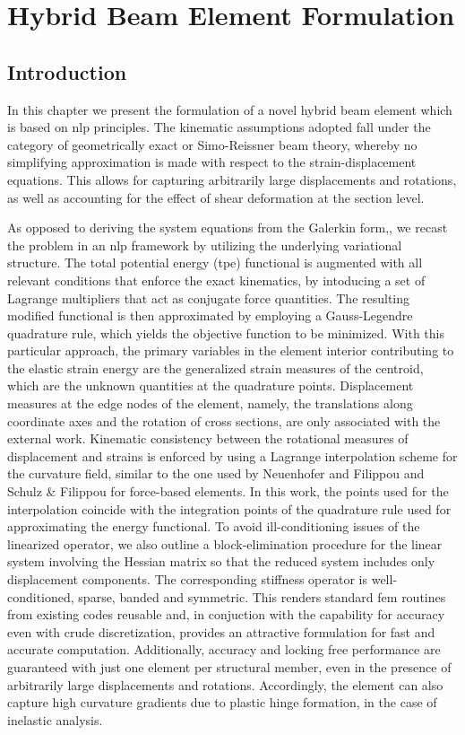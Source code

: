 \chapter{Hybrid Beam Element Formulation}\label{chapter:CH2}


\section{Introduction}\label{section:CH2-S1}
In this chapter we present the formulation of a
novel hybrid beam element which is based on \acrshort{nlp} principles. The 
kinematic assumptions adopted fall under the category of 
geometrically exact or Simo-Reissner beam 
theory\cite{Reissner1,Simo1,Simo2,Simo3}, whereby no simplifying approximation 
is made with respect to the strain-displacement equations. This allows for 
capturing arbitrarily large displacements and rotations, as well as 
accounting for the effect of shear deformation at the section level. 

As opposed to deriving the system equations
from the Galerkin form,, we recast the
problem in an \acrshort{nlp} framework by utilizing the underlying
variational structure. The total potential energy (\acrshort{tpe}) functional 
is augmented with
all relevant conditions that enforce the exact kinematics, by intoducing a set
of Lagrange multipliers that act as conjugate force quantities. The resulting
modified functional is then approximated by employing a Gauss-Legendre 
quadrature
rule, which yields the objective function to be minimized. With this particular
approach, the primary variables in the element interior contributing to the
elastic strain energy are the generalized strain measures of the
centroid, which are the unknown quantities at the quadrature points.
Displacement measures at the edge nodes of the element, namely, the translations
along coordinate axes and the rotation of cross sections, are only
associated with the external work. Kinematic consistency between the rotational
measures of displacement and strains is enforced by using a Lagrange
interpolation scheme for the curvature field, similar to the one
used by Neuenhofer and
Filippou \cite{Neuenhofer} and Schulz \& Filippou \cite{Schulz}
for force-based elements. In this work, the points used for 
the interpolation
coincide with the integration points of the quadrature rule used for 
approximating
the energy functional. To avoid ill-conditioning issues of the 
linearized operator, we also outline a block-elimination procedure for the 
linear system involving the Hessian matrix so that the
reduced system includes only displacement components. The corresponding
stiffness operator is well-conditioned, sparse, banded and symmetric. This 
renders standard \acrshort{fem} routines from existing codes 
reusable and, in conjuction with the capability for accuracy even with crude
discretization, provides an attractive formulation for fast and accurate
computation. Additionally, accuracy and locking free performance are guaranteed
with just one element per structural member, even in the presence of arbitrarily
large displacements and rotations. Accordingly, the element can also capture 
high 
curvature gradients due to plastic hinge formation, in the case of inelastic
analysis.

